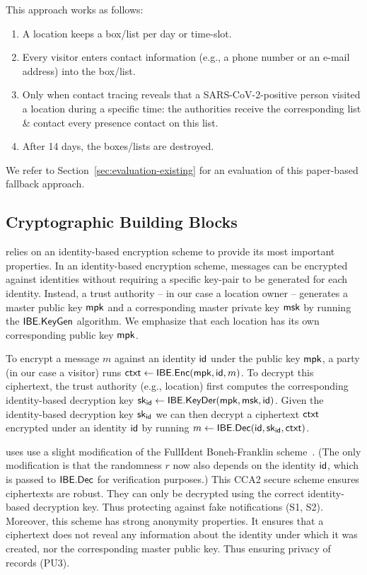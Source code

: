 This approach works as follows:

\begin{enumerate}
\item A location keeps a box/list per day or time-slot.
\item Every visitor enters contact information (e.g., a phone number or an e-mail address) into the box/list.
\item Only when contact tracing reveals that a SARS-CoV-2-positive person visited a location during a specific time: the authorities receive the corresponding list \& contact every presence contact on this list.
\item After 14 days, the boxes/lists are destroyed.
\end{enumerate}

We refer to Section~\ref{sec:evaluation-existing} for an evaluation of this
paper-based fallback approach.

\subsection{Cryptographic Building Blocks}

\name relies on an identity-based encryption scheme to provide its most important properties. In an identity-based encryption scheme, messages can be encrypted against identities without requiring a specific key-pair to be generated for each identity. Instead, a trust authority -- in our case a location owner -- generates a master public key $\textsf{mpk}$ and a corresponding master private key $\textsf{msk}$ by running the $\textsf{IBE.KeyGen}$ algorithm. We emphasize that each location has its own corresponding public key $\textsf{mpk}$.

To encrypt a message $m$ against an identity $\textsf{id}$ under the public key $\textsf{mpk}$, a party (in our case a visitor) runs $\textsf{ctxt} \gets \textsf{IBE.Enc}(\textsf{mpk}, \textsf{id}, m)$. To decrypt this ciphertext, the trust authority (e.g., location) first computes the corresponding identity-based decryption key $\textsf{sk}_{\textsf{id}} \gets \textsf{IBE.KeyDer}(\textsf{mpk}, \textsf{msk}, \textsf{id})$. Given the identity-based decryption key $\textsf{sk}_{\textsf{id}}$ we can then decrypt a ciphertext $\textsf{ctxt}$ encrypted under an identity $\textsf{id}$ by running $m \gets \textsf{IBE.Dec}(\textsf{id},\allowbreak \textsf{sk}_{\textsf{id}},\allowbreak \textsf{ctxt})$.

\name uses use a slight modification of the FullIdent Boneh-Franklin scheme~\cite{BonehF01}. (The only modification is that the randomness $r$ now also depends on the identity $\textsf{id}$, which is passed to $\textsf{IBE.Dec}$ for verification purposes.) This CCA2 secure scheme ensures ciphertexts are robust. They can only be decrypted using the correct identity-based decryption key. Thus protecting against fake notifications (S1, S2). Moreover, this scheme has strong anonymity properties. It ensures that a ciphertext does not reveal any information about the identity under which it was created, nor the corresponding master public key. Thus ensuring privacy of records (PU3).

